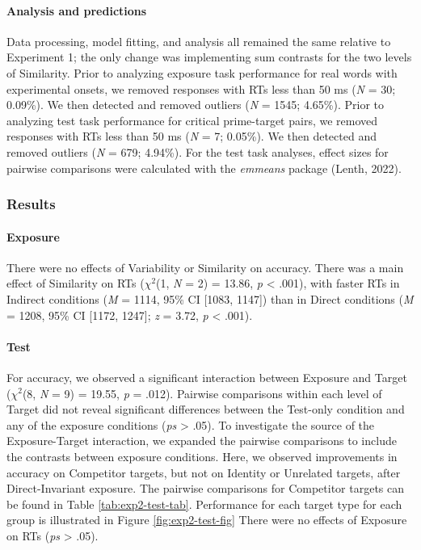 \documentclass[
  12pt,
  twoside]{article}
\begin{document}
\hypertarget{analysis-and-predictions}{%
\paragraph{Analysis and predictions}\label{analysis-and-predictions}}

Data processing, model fitting, and analysis all remained the same relative to Experiment 1; the only change was implementing sum contrasts for the two levels of Similarity.
Prior to analyzing exposure task performance for real words with experimental onsets, we removed responses with RTs less than 50 ms (\emph{N} = 30; 0.09\%).
We then detected and removed outliers (\emph{N} = 1545; 4.65\%).
Prior to analyzing test task performance for critical prime-target pairs, we removed responses with RTs less than 50 ms (\emph{N} = 7; 0.05\%).
We then detected and removed outliers (\emph{N} = 679; 4.94\%).
For the test task analyses, effect sizes for pairwise comparisons were calculated with the \emph{emmeans} package (Lenth, 2022).

\hypertarget{results-1}{%
\subsubsection{Results}\label{results-1}}

\hypertarget{exposure-1}{%
\paragraph{Exposure}\label{exposure-1}}

There were no effects of Variability or Similarity on accuracy.
There was a main effect of Similarity on RTs (\(\chi^2\)(1, \emph{N} = 2) = 13.86, \emph{p} \textless{} .001), with faster RTs in Indirect conditions (\emph{M} = 1114, 95\% CI {[}1083, 1147{]}) than in Direct conditions (\emph{M} = 1208, 95\% CI {[}1172, 1247{]}; \emph{z} = 3.72, \emph{p} \textless{} .001).

\hypertarget{test-1}{%
\paragraph{Test}\label{test-1}}

For accuracy, we observed a significant interaction between Exposure and Target (\(\chi^2\)(8, \emph{N} = 9) = 19.55, \emph{p} = .012).
Pairwise comparisons within each level of Target did not reveal significant differences between the Test-only condition and any of the exposure conditions (\emph{ps} \textgreater{} .05).
To investigate the source of the Exposure-Target interaction, we expanded the pairwise comparisons to include the contrasts between exposure conditions.
Here, we observed improvements in accuracy on Competitor targets, but not on Identity or Unrelated targets, after Direct-Invariant exposure.
The pairwise comparisons for Competitor targets can be found in Table \ref{tab:exp2-test-tab}.
Performance for each target type for each group is illustrated in Figure \ref{fig:exp2-test-fig}
There were no effects of Exposure on RTs (\emph{ps} \textgreater{} .05).
\end{document}
